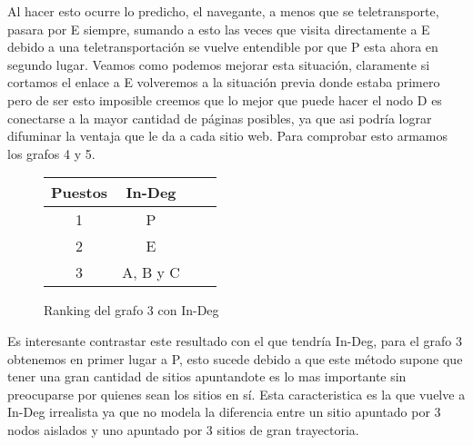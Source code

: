 Al hacer esto ocurre lo predicho, el navegante, a menos que se teletransporte, pasara por E siempre, sumando a esto las veces que visita directamente a E debido a una teletransportación se vuelve entendible por que P esta ahora en segundo lugar. Veamos como podemos mejorar esta situación, claramente si cortamos el enlace a E volveremos a la situación previa donde estaba primero pero de ser esto imposible creemos que lo mejor que puede hacer el nodo D es conectarse a la mayor cantidad de páginas posibles, ya que asi podría lograr difuminar la ventaja que le da a cada sitio web. Para comprobar esto armamos los grafos 4 y 5.

\begin{figure}[H]
\centering
\begin{tabular}{| c | c | c | c |}
  \hline
  Puestos & In-Deg\\ \hline \hline
  1 & P\\ \hline
  2 & E\\ \hline
  3 & A, B y C\\ \hline
\end{tabular}
  \caption{\footnotesize{Ranking del grafo 3 con In-Deg}}
  \label{fig:Rankings}
\end{figure}


Es interesante contrastar este resultado con el que tendría In-Deg, para el grafo 3 obtenemos en primer lugar a P, esto sucede debido a que este método supone que tener una gran cantidad de sitios apuntandote es lo mas importante sin preocuparse por quienes sean los sitios en sí. Esta caracteristica es la que vuelve a In-Deg irrealista ya que no modela la diferencia entre un sitio apuntado por 3 nodos aislados y uno apuntado por 3 sitios de gran trayectoria.

